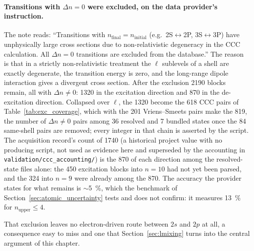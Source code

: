 \paragraph{Transitions with $\Delta n = 0$ were excluded, on the data
provider's instruction.} The note reads: ``Transitions with
$n_{\mathrm{final}} = n_{\mathrm{initial}}$ (e.g.\ 2S$\leftrightarrow$2P,
3S$\leftrightarrow$3P) have unphysically large cross sections due to
non-relativistic degeneracy in the CCC calculation. All $\Delta n = 0$
transitions are excluded from the database.'' The reason is that in a strictly
non-relativistic treatment the $\ell$ sublevels of a shell are exactly
degenerate, the transition energy is zero, and the long-range dipole interaction
gives a divergent cross section. After the exclusion 2190 blocks remain, all
with $\Delta n \ne 0$: 1320 in the excitation direction and 870 in the
de-excitation direction. Collapsed over $\ell$, the 1320 become the 618 CCC
pairs of Table~\ref{tab:exc_coverage}, which with the 201 Vriens--Smeets pairs
make the 819, the number of $\Delta n \ne 0$ pairs among 36 resolved and 7
bundled states once the 84 same-shell pairs are removed; every integer in that
chain is asserted by the script. The acquisition record's count of 1740 (a
historical project value with no producing script, not used as evidence here and
superseded by the accounting in \texttt{validation/ccc\_accounting/}) is the 870
of each direction among the resolved-state files alone: the 450 excitation blocks into $n=10$ had not yet
been parsed, and the 324 into $n=9$ were already among the 870. The accuracy the provider states for what remains is
$\sim$\SI{5}{\percent}, which
the benchmark of Section~\ref{sec:atomic_uncertainty} tests and does not
confirm: it measures \SI{13}{\percent} for $n_{\text{upper}} \le 4$.

That exclusion leaves no electron-driven route between $2s$ and $2p$ at all, a
consequence easy to miss and one that Section~\ref{sec:lmixing} turns into the
central argument of this chapter.

